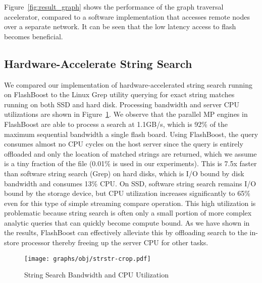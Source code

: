 Figure~\ref{fig:result_graph} shows the performance of the graph traversal
accelerator, compared to a software implementation that accesses remote nodes
over a separate network. It can be seen that the low latency access to flash
becomes beneficial.




\subsection{Hardware-Accelerate String Search}

We compared our implementation of hardware-accelerated string search running on
FlashBoost to the Linux Grep utility querying for exact string matches running
on both SSD and hard disk. Processing bandwidth and server CPU utilizations are
shown in Figure~\ref{fig:result_strstr}. We observe that the parallel MP
engines in FlashBoost are able to process a search at 1.1GB/s, which is 92\% of
the maximum sequential bandwidth a single flash board. Using FlashBoost, the
query consumes almost no CPU cycles on the host server since the query is
entirely offloaded and only the location of matched strings are returned, which
we assume is a tiny fraction of the file (0.01\% is used in our experiments).
This is 7.5x faster than software string search (Grep) on hard disks, which is
I/O bound by disk bandwidth and consumes 13\% CPU. On SSD, software string
search remains I/O bound by the storage device, but CPU utilization increases
significantly to 65\% even for this type of simple streaming compare operation.
This high utilization is problematic because string search is often only a small portion 
of more complex analytic queries that can quickly become compute bound.  As we
have shown in the results, FlashBoost can effectively alleviate this by
offloading search to the in-store processor thereby freeing up the server CPU
for other tasks. 
\begin{figure}[ht!]
	\centering
	\texttt{[image: graphs/obj/strstr-crop.pdf]}
	\caption{String Search Bandwidth and CPU Utilization}
	\label{fig:result_strstr}
\end{figure}
 
